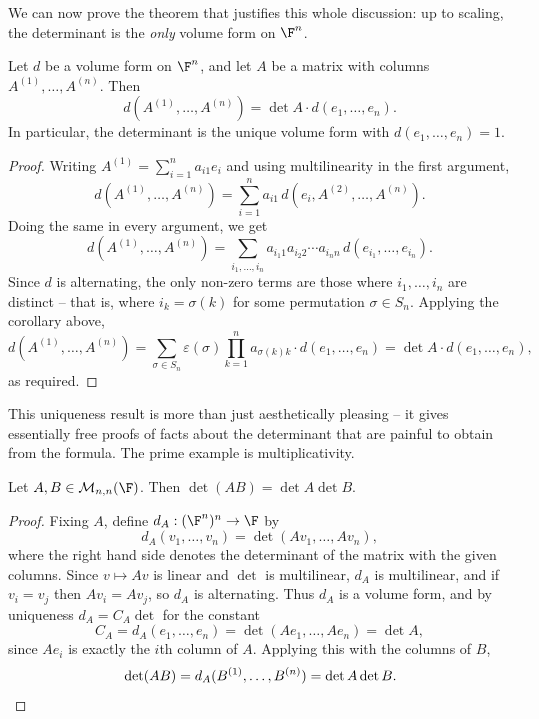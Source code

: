 We can now prove the theorem that justifies this whole discussion: up to scaling, the determinant is the \emph{only} volume form on $\F^n$.

\begin{theorem}
    Let $d$ be a volume form on $\F^n$, and let $A$ be a matrix with columns $A^{(1)}, \dots, A^{(n)}$. Then
    $$
    d(A^{(1)}, \dots, A^{(n)}) = \det A \cdot d(e_1, \dots, e_n).
    $$
    In particular, the determinant is the unique volume form with $d(e_1, \dots, e_n) = 1$.
\end{theorem}
\begin{proof}
    Writing $A^{(1)} = \sum_{i = 1}^n a_{i1}e_i$ and using multilinearity in the first argument,
    $$
    d(A^{(1)}, \dots, A^{(n)}) = \sum_{i = 1}^n a_{i1}\, d(e_i, A^{(2)}, \dots, A^{(n)}).
    $$
    Doing the same in every argument, we get
    $$
    d(A^{(1)}, \dots, A^{(n)}) = \sum_{i_1, \dots, i_n} a_{i_1 1} a_{i_2 2}\cdots a_{i_n n}\, d(e_{i_1}, \dots, e_{i_n}).
    $$
    Since $d$ is alternating, the only non-zero terms are those where $i_1, \dots, i_n$ are distinct -- that is, where $i_k = \sigma(k)$ for some permutation $\sigma \in S_n$. Applying the corollary above,
    $$
    d(A^{(1)}, \dots, A^{(n)}) = \sum_{\sigma \in S_n} \varepsilon(\sigma) \prod_{k = 1}^n a_{\sigma(k)k} \cdot d(e_1, \dots, e_n) = \det A \cdot d(e_1, \dots, e_n),
    $$
    as required.
\end{proof}

This uniqueness result is more than just aesthetically pleasing -- it gives essentially free proofs of facts about the determinant that are painful to obtain from the formula. The prime example is multiplicativity.

\begin{theorem}
    Let $A, B \in \mathcal{M}_{n,n}(\F)$. Then $\det (AB) = \det A \det B$.
\end{theorem}
\begin{proof}
    Fixing $A$, define $d_A: (\F^n)^n \rightarrow \F$ by
    $$
    d_A(v_1, \dots, v_n) = \det(Av_1, \dots, Av_n),
    $$
    where the right hand side denotes the determinant of the matrix with the given columns. Since $v \mapsto Av$ is linear and $\det$ is multilinear, $d_A$ is multilinear, and if $v_i = v_j$ then $Av_i = Av_j$, so $d_A$ is alternating. Thus $d_A$ is a volume form, and by uniqueness $d_A = C_A \det$ for the constant
    $$
    C_A = d_A(e_1, \dots, e_n) = \det(Ae_1, \dots, Ae_n) = \det A,
    $$
    since $Ae_i$ is exactly the $i$th column of $A$. Applying this with the columns of $B$,
    $$
    \det(AB) = d_A(B^{(1)}, \dots, B^{(n)}) = \det A \det B. \qedhere
    $$
\end{proof}

